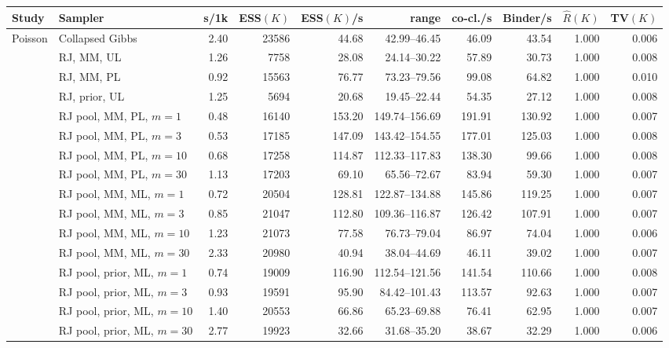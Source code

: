 \begin{tabular}{ll rrrrrrrr}
\toprule
Study & Sampler & s/1k & ESS$(K)$ & ESS$(K)$/s & range & co-cl./s & Binder/s & $\hat R(K)$ & TV$(K)$ \\
\midrule
Poisson & Collapsed Gibbs & 2.40 & 23586 & 44.68 & 42.99--46.45 & 46.09 & 43.54 & 1.000 & 0.006 \\
 & RJ, MM, UL & 1.26 & 7758 & 28.08 & 24.14--30.22 & 57.89 & 30.73 & 1.000 & 0.008 \\
 & RJ, MM, PL & 0.92 & 15563 & 76.77 & 73.23--79.56 & 99.08 & 64.82 & 1.000 & 0.010 \\
 & RJ, prior, UL & 1.25 & 5694 & 20.68 & 19.45--22.44 & 54.35 & 27.12 & 1.000 & 0.008 \\
 & RJ pool, MM, PL, $m{=}1$ & 0.48 & 16140 & 153.20 & 149.74--156.69 & 191.91 & 130.92 & 1.000 & 0.007 \\
 & RJ pool, MM, PL, $m{=}3$ & 0.53 & 17185 & 147.09 & 143.42--154.55 & 177.01 & 125.03 & 1.000 & 0.008 \\
 & RJ pool, MM, PL, $m{=}10$ & 0.68 & 17258 & 114.87 & 112.33--117.83 & 138.30 & 99.66 & 1.000 & 0.008 \\
 & RJ pool, MM, PL, $m{=}30$ & 1.13 & 17203 & 69.10 & 65.56--72.67 & 83.94 & 59.30 & 1.000 & 0.007 \\
 & RJ pool, MM, ML, $m{=}1$ & 0.72 & 20504 & 128.81 & 122.87--134.88 & 145.86 & 119.25 & 1.000 & 0.007 \\
 & RJ pool, MM, ML, $m{=}3$ & 0.85 & 21047 & 112.80 & 109.36--116.87 & 126.42 & 107.91 & 1.000 & 0.007 \\
 & RJ pool, MM, ML, $m{=}10$ & 1.23 & 21073 & 77.58 & 76.73--79.04 & 86.97 & 74.04 & 1.000 & 0.006 \\
 & RJ pool, MM, ML, $m{=}30$ & 2.33 & 20980 & 40.94 & 38.04--44.69 & 46.11 & 39.02 & 1.000 & 0.007 \\
 & RJ pool, prior, ML, $m{=}1$ & 0.74 & 19009 & 116.90 & 112.54--121.56 & 141.54 & 110.66 & 1.000 & 0.008 \\
 & RJ pool, prior, ML, $m{=}3$ & 0.93 & 19591 & 95.90 & 84.42--101.43 & 113.57 & 92.63 & 1.000 & 0.007 \\
 & RJ pool, prior, ML, $m{=}10$ & 1.40 & 20553 & 66.86 & 65.23--69.88 & 76.41 & 62.95 & 1.000 & 0.007 \\
 & RJ pool, prior, ML, $m{=}30$ & 2.77 & 19923 & 32.66 & 31.68--35.20 & 38.67 & 32.29 & 1.000 & 0.006 \\

\end{tabular}
